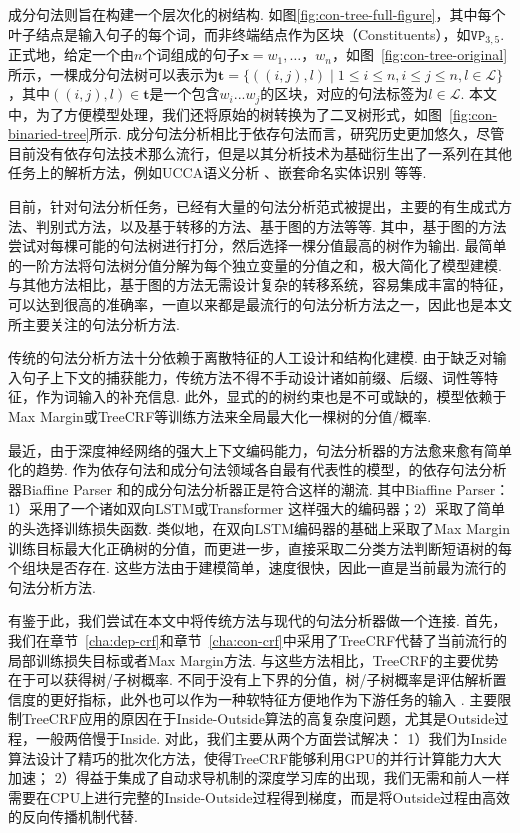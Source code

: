 
成分句法则旨在构建一个层次化的树结构.
如图\ref{fig:con-tree-full-figure}，其中每个叶子结点是输入句子的每个词，而非终端结点作为区块（Constituents），如$\texttt{VP}_{3,5}$.
正式地，给定一个由$n$个词组成的句子$\boldsymbol{x}=w_1,\dots，w_{n}$，如图~\ref{fig:con-tree-original}所示，一棵成分句法树可以表示为$\boldsymbol{t}=\{((i, j),l)\mid 1\le i \le n,i \le j \le n,l \in \mathcal{L}\}$，其中$((i,j),l) \in \boldsymbol{t}$是一个包含$w_{i}...w_{j}$的区块，对应的句法标签为$l \in \mathcal{L}$.
本文中，为了方便模型处理，我们还将原始的树转换为了二叉树形式，如图~\ref{fig:con-binaried-tree}所示.
成分句法分析相比于依存句法而言，研究历史更加悠久，尽管目前没有依存句法技术那么流行，但是以其分析技术为基础衍生出了一系列在其他任务上的解析方法，例如UCCA语义分析 \citep{jiang-etal-2019-hlt}、嵌套命名实体识别 \citep{fu-etal-2021-nested}等等.

目前，针对句法分析任务，已经有大量的句法分析范式被提出，主要的有生成式方法、判别式方法，以及基于转移的方法、基于图的方法等等.
其中，基于图的方法尝试对每棵可能的句法树进行打分，然后选择一棵分值最高的树作为输出.
最简单的一阶方法将句法树分值分解为每个独立变量的分值之和，极大简化了模型建模.
与其他方法相比，基于图的方法无需设计复杂的转移系统，容易集成丰富的特征，可以达到很高的准确率，一直以来都是最流行的句法分析方法之一，因此也是本文所主要关注的句法分析方法.

传统的句法分析方法十分依赖于离散特征的人工设计和结构化建模.
由于缺乏对输入句子上下文的捕获能力，传统方法不得不手动设计诸如前缀、后缀、词性等特征，作为词输入的补充信息.
此外，显式的的树约束也是不可或缺的，模型依赖于Max Margin或TreeCRF等训练方法来全局最大化一棵树的分值/概率.

最近，由于深度神经网络的强大上下文编码能力，句法分析器的方法愈来愈有简单化的趋势.
作为依存句法和成分句法领域各自最有代表性的模型，\citet{dozat-etal-2017-biaffine}的依存句法分析器Biaffine Parser 和\citet{stern-etal-2017-minimal}的成分句法分析器正是符合这样的潮流.
其中Biaffine Parser： 1）采用了一个诸如双向LSTM或Transformer \citep{vaswani-2017-attention}这样强大的编码器；2）采取了简单的头选择训练损失函数.
类似地，\citet{stern-etal-2017-minimal}在双向LSTM编码器的基础上采取了Max Margin训练目标最大化正确树的分值，而\citet{gaddy-etal-2018-whats}更进一步，直接采取二分类方法判断短语树的每个组块是否存在.
这些方法由于建模简单，速度很快，因此一直是当前最为流行的句法分析方法.

有鉴于此，我们尝试在本文中将传统方法与现代的句法分析器做一个连接.
首先，我们在章节~\ref{cha:dep-crf}和章节~\ref{cha:con-crf}中采用了TreeCRF代替了当前流行的局部训练损失目标或者Max Margin方法.
与这些方法相比，TreeCRF的主要优势在于可以获得树/子树概率.
不同于没有上下界的分值，树/子树概率是评估解析置信度的更好指标，此外也可以作为一种软特征方便地作为下游任务的输入 \citep{zhang-etal-2019-syntax,zhang-etal-2020-syntax}.
主要限制TreeCRF应用的原因在于Inside-Outside算法的高复杂度问题，尤其是Outside过程，一般两倍慢于Inside.
对此，我们主要从两个方面尝试解决：
1）我们为Inside算法设计了精巧的批次化方法，使得TreeCRF能够利用GPU的并行计算能力大大加速；
2）得益于集成了自动求导机制的深度学习库的出现，我们无需和前人一样需要在CPU上进行完整的Inside-Outside过程得到梯度，而是将Outside过程由高效的反向传播机制代替.

